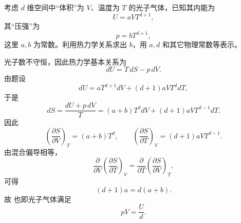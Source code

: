 \begin{question}
考虑 $d$ 维空间中“体积”为 $V$、温度为 $T$ 的光子气体，已知其内能为
\[
U=aVT^{d+1},
\]
其“压强”为
\[
p=bT^{d+1},
\]
这里 $a,b$ 为常数。利用热力学关系求出 $b$，用 $a,d$ 和其它物理常数等表示。

\begin{solution}
光子数不守恒，因此热力学基本关系为
\[
dU=T\,dS-p\,dV.
\]
由题设
\[
dU=aT^{d+1}dV+(d+1)aVT^d dT,
\]
于是
\[
dS=\frac{dU+p\,dV}{T}=(a+b)T^d dV+(d+1)aVT^{d-1}dT.
\]
因此
\[
\left(\frac{\partial S}{\partial V}\right)_T=(a+b)T^d,
\qquad
\left(\frac{\partial S}{\partial T}\right)_V=(d+1)aVT^{d-1}.
\]
由混合偏导相等，
\[
\frac{\partial}{\partial V}\left(\frac{\partial S}{\partial T}\right)_V
=
\frac{\partial}{\partial T}\left(\frac{\partial S}{\partial V}\right)_T,
\]
可得
\[
(d+1)a=d(a+b).
\]
故
也即光子气体满足
\[
pV=\frac{U}{d}.
\]
\end{solution}
\end{question}


